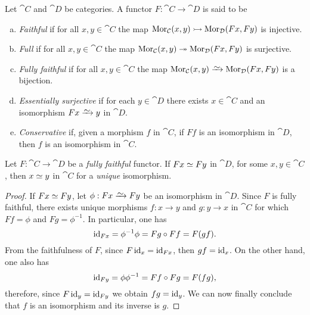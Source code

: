 \begin{definition}
\label{def:faithful-full-fully-faithful-essencially-surjective-conservative}
Let \(\cat C\) and \(\cat D\) be categories. A functor \(F: \cat C \to \cat D\)
is said to be
\begin{enumerate}[(a)]\setlength\itemsep{0em}
\item \emph{Faithful} if for all \(x, y \in \cat C\) the map \(\operatorname{Mor}_{\mathcal C}(x,
  y) \rightarrowtail \operatorname{Mor}_{\mathcal D}(F x, F y)\) is injective.
\item \emph{Full} if for all \(x, y \in \cat C\) the map \(\operatorname{Mor}_{\mathcal C}(x, y)
  \twoheadrightarrow \operatorname{Mor}_{\mathcal D}(F x, F y)\) is surjective.
\item \emph{Fully faithful} if for all \(x, y \in \cat C\) the map \(\Hom_{\cat
    C}(x, y) \isoto \Hom_{\cat D}(F x, F y)\) is a bijection.
\item \emph{Essentially surjective} if for each \(y \in \cat D\) there exists
  \(x \in \cat C\) and an isomorphism \(F x \isoto y\) in \(\cat D\).
\item \emph{Conservative} if, given a morphism \(f\) in \(\cat C\), if \(F f\)
  is an isomorphism in \(\cat D\), then \(f\) is an isomorphism in \(\cat C\).
\end{enumerate}
\end{definition}

\begin{proposition}
\label{prop:fully-faithful-image-iso-then-obj-iso}
Let \(F: \cat C \to \cat D\) be a \emph{fully faithful} functor. If
\(F x \simeq F y\) in \(\cat D\), for some \(x, y \in \cat C\), then \(x \simeq y\)
in \(\cat C\) for a \emph{unique} isomorphism.
\end{proposition}

\begin{proof}
If \(F x \simeq F y\), let \(\phi: F x \isoto F y\) be an isomorphism in
\(\cat D\). Since \(F\) is fully faithful, there exists unique morphisms
\(f: x \to y\) and \(g: y \to x\) in \(\cat C\) for which \(F f = \phi\) and
\(F g = \phi^{-1}\). In particular, one has
\[
\operatorname{id}_{F x} =  \phi^{-1} \phi = F g \circ F f = F(g f).
\]
From the faithfulness of \(F\), since \(F \operatorname{id}_x = \operatorname{id}_{F x}\), then
\(g f = \operatorname{id}_x\). On the other hand, one also has
\[
\operatorname{id}_{F y} = \phi \phi^{-1} = F f \circ F g = F(f g),
\]
therefore, since \(F \operatorname{id}_y = \operatorname{id}_{F y}\) we obtain \(f g = \operatorname{id}_y\). We can now
finally conclude that \(f\) is an isomorphism and its inverse is \(g\).
\end{proof}

